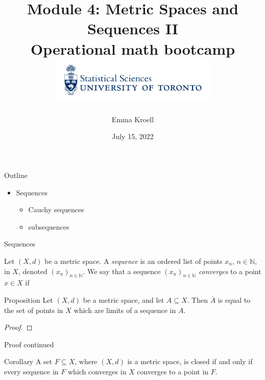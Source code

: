 \documentclass [aspectratio=169]{beamer}
\title[]{Module 4: Metric Spaces and Sequences II\\ {\large Operational math bootcamp}\\ \includegraphics[width=8cm]{dept_logo.png}\vspace{-1em}}
\author[]{Emma Kroell}
\institute[]{University of Toronto}
\date{July 15, 2022}
\newcommand{\N}{{\mathbb{N}}}
\begin{document}
{
\begin{frame}
    \titlepage
\end{frame}
}

\begin{frame}{Outline}
    \begin{itemize}
      \setlength\itemsep{1em}
    	\item Sequences
	\begin{itemize}
	\item Cauchy sequences
	\item subsequences
	\end{itemize}
    \end{itemize}
\end{frame}


\begin{frame}{Sequences}
\begin{definition}[Sequence]
Let $(X,d)$ be a metric space. A \emph{sequence} is an ordered list of points $x_n$, $n\in\N$, in $X$, denoted $(x_n)_{n \in \N}$. We say that a sequence $(x_n)_{n \in \N}$ \emph{converges} to a point $x \in X$ if 
\vspace{1cm}

\end{definition}
\end{frame}


\begin{frame}
\begin{exampleblock}{Proposition}
Let $(X, d)$ be a metric space, and let $A \subseteq X$. Then $\overline A$ is equal to the set of points in $X$ which are limits of a sequence in $A$.
\end{exampleblock}

\begin{proof}
\vspace{4cm}
\end{proof}
\end{frame}


\begin{frame}
\begin{block}{Proof continued}
\vspace{3cm}
\end{block}
\vspace{0.75cm}
\begin{alertblock}{Corollary}
\label{cor:closed_converge}
A set $F \subseteq X$, where $(X, d)$ is a metric space, is closed if and only if every sequence in $F$ which converges in $X$ converges to a point in $F$.
\end{alertblock}
\end{frame}
\end{document}
